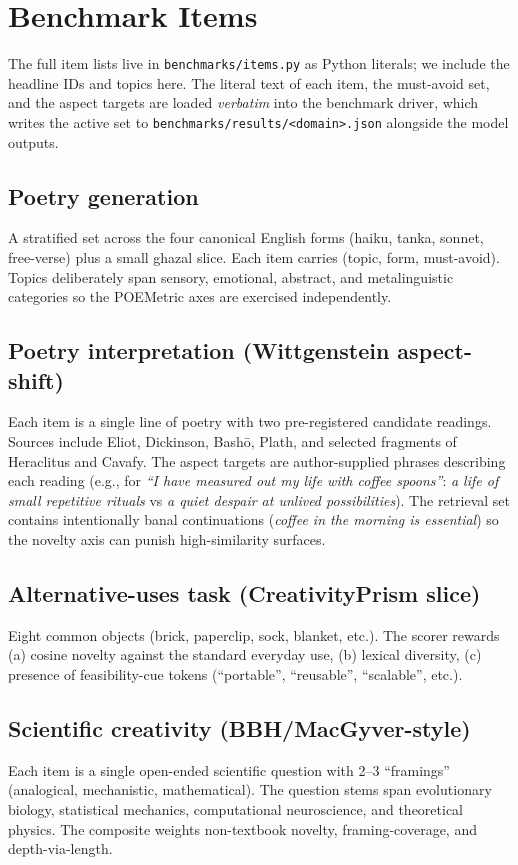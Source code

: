 \section{Benchmark Items}\label{app:benchmark_items}

The full item lists live in \texttt{benchmarks/items.py} as Python literals; we include the headline IDs and topics here. The literal text of each item, the must-avoid set, and the aspect targets are loaded \emph{verbatim} into the benchmark driver, which writes the active set to \texttt{benchmarks/results/<domain>.json} alongside the model outputs.

\subsection{Poetry generation}
A stratified set across the four canonical English forms (haiku, tanka, sonnet, free-verse) plus a small ghazal slice. Each item carries (topic, form, must-avoid). Topics deliberately span sensory, emotional, abstract, and metalinguistic categories so the POEMetric axes are exercised independently.

\subsection{Poetry interpretation (Wittgenstein aspect-shift)}
Each item is a single line of poetry with two pre-registered candidate readings. Sources include Eliot, Dickinson, Bash\=o, Plath, and selected fragments of Heraclitus and Cavafy. The aspect targets are author-supplied phrases describing each reading (e.g., for \emph{``I have measured out my life with coffee spoons''}: \emph{a life of small repetitive rituals} vs \emph{a quiet despair at unlived possibilities}). The retrieval set contains intentionally banal continuations (\emph{coffee in the morning is essential}) so the novelty axis can punish high-similarity surfaces.

\subsection{Alternative-uses task (CreativityPrism slice)}
Eight common objects (brick, paperclip, sock, blanket, etc.). The scorer rewards (a) cosine novelty against the standard everyday use, (b) lexical diversity, (c) presence of feasibility-cue tokens (``portable'', ``reusable'', ``scalable'', etc.).

\subsection{Scientific creativity (BBH/MacGyver-style)}
Each item is a single open-ended scientific question with 2--3 ``framings'' (analogical, mechanistic, mathematical). The question stems span evolutionary biology, statistical mechanics, computational neuroscience, and theoretical physics. The composite weights non-textbook novelty, framing-coverage, and depth-via-length.
